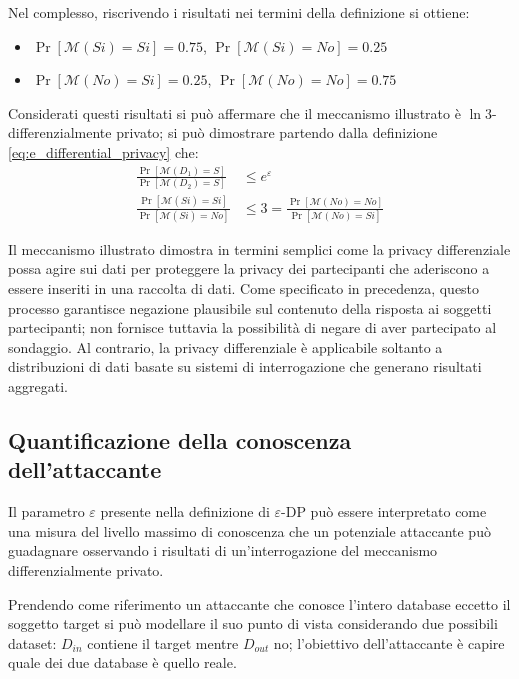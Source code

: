 Nel complesso, riscrivendo i risultati nei termini della definizione si ottiene:
\begin{itemize}
    \item $\Pr[\mathcal{M}(Si) = Si] = 0.75$, $\Pr[\mathcal{M}(Si) = No] = 0.25$
    \item $\Pr[\mathcal{M}(No) = Si] = 0.25$, $\Pr[\mathcal{M}(No) = No] = 0.75$
\end{itemize}

Considerati questi risultati si può affermare che il meccanismo illustrato è $\ln{3}$-differenzialmente privato; si può dimostrare partendo dalla definizione \eqref{eq:e_differential_privacy} che:
\begin{align*}
    \frac{\Pr[\mathcal{M}(D_1) = S]}{\Pr[\mathcal{M}(D_2) = S]
    } &\le e^{\varepsilon}\\
    \frac{\Pr[\mathcal{M}(Si) = Si]}{\Pr[\mathcal{M}(Si) = No]} &\le 3 = \frac{\Pr[\mathcal{M}(No) = No]}{\Pr[\mathcal{M}(No) = Si]}
\end{align*}

Il meccanismo illustrato dimostra in termini semplici come la privacy differenziale possa agire sui dati per proteggere la privacy dei partecipanti che aderiscono a essere inseriti in una raccolta di dati. Come specificato in precedenza, questo processo garantisce negazione plausibile sul contenuto della risposta ai soggetti partecipanti; non fornisce tuttavia la possibilità di negare di aver partecipato al sondaggio. Al contrario, la privacy differenziale è applicabile soltanto a distribuzioni di dati basate su sistemi di interrogazione che generano risultati aggregati.

\subsection{Quantificazione della conoscenza dell'attaccante}
Il parametro $\varepsilon$ presente nella definizione di $\varepsilon$-DP può essere interpretato come una misura del livello massimo di conoscenza che un potenziale attaccante può guadagnare osservando i risultati di un'interrogazione del meccanismo differenzialmente privato.

Prendendo come riferimento un attaccante che conosce l'intero database eccetto il soggetto target si può modellare il suo punto di vista considerando due possibili dataset: $D_{in}$ contiene il target mentre $D_{out}$ no; l'obiettivo dell'attaccante è capire quale dei due database è quello reale.

